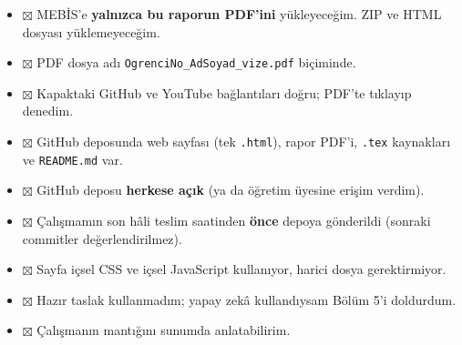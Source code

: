 \documentclass[12pt,a4paper]{article}
\begin{document}
\begin{itemize}
  \item $\boxtimes$ MEBİS'e \textbf{yalnızca bu raporun PDF'ini} yükleyeceğim. ZIP ve HTML dosyası yüklemeyeceğim.
  \item $\boxtimes$ PDF dosya adı \texttt{OgrenciNo\_AdSoyad\_vize.pdf} biçiminde.
  \item $\boxtimes$ Kapaktaki GitHub ve YouTube bağlantıları doğru; PDF'te tıklayıp denedim.
  \item $\boxtimes$ GitHub deposunda web sayfası (tek \texttt{.html}), rapor PDF'i, \texttt{.tex} kaynakları ve \texttt{README.md} var.
  \item $\boxtimes$ GitHub deposu \textbf{herkese açık} (ya da öğretim üyesine erişim verdim).
  \item $\boxtimes$ Çalışmamın son hâli teslim saatinden \textbf{önce} depoya gönderildi (sonraki commitler değerlendirilmez).
  \item $\boxtimes$ Sayfa içsel CSS ve içsel JavaScript kullanıyor, harici dosya gerektirmiyor.
  \item $\boxtimes$ Hazır taslak kullanmadım; yapay zekâ kullandıysam Bölüm 5'i doldurdum.
  \item $\boxtimes$ Çalışmanın mantığını sunumda anlatabilirim.
\end{itemize}
\end{document}
